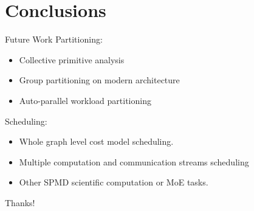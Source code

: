 \documentclass{beamer}
\begin{document}
\section{Conclusions}
     \begin{frame}{Future Work}
     Partitioning:
     \begin{itemize}
         \item Collective primitive analysis
         \item Group partitioning on modern architecture
         \item Auto-parallel workload partitioning
     \end{itemize}
     Scheduling:
     \begin{itemize}
         \item Whole graph level cost model scheduling.
         \item Multiple computation and communication streams scheduling
         \item Other SPMD scientific computation or MoE tasks.
     \end{itemize}
 \end{frame}

\begin{frame}
    \begin{center}
        {\Huge\calligra Thanks!}
    \end{center}
\end{frame}
\end{document}
